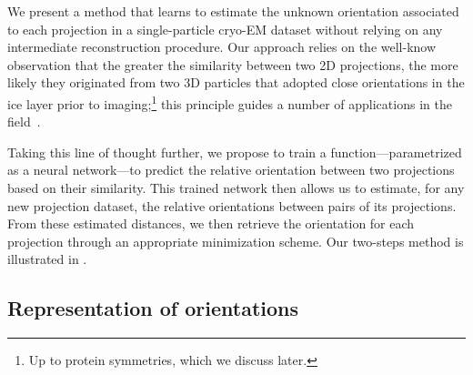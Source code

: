 We present a method that learns to estimate the unknown orientation associated to each projection in a single-particle cryo-EM dataset without relying on any intermediate reconstruction procedure. Our approach relies on the well-know observation that the greater the similarity between two 2D projections, the more likely they originated from two 3D particles that adopted close orientations in the ice layer prior to imaging;\footnote{Up to protein symmetries, which we discuss later.} this principle guides a number of applications in the field~\cite{frank2006three}.

Taking this line of thought further, we propose to train a function---parametrized as a neural network---to predict the relative orientation between two projections based on their similarity. This trained network then allows us to estimate, for any new projection dataset, the relative orientations between pairs of its projections. From these estimated distances, we then retrieve the orientation for each projection through an appropriate minimization scheme. Our two-steps method is illustrated in .






\subsection{Representation of orientations}\label{sec:method:orientation-representation}

